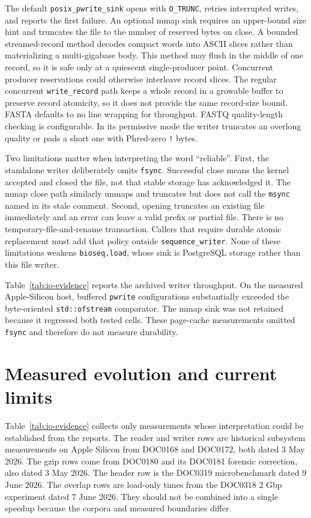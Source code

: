 The default \texttt{posix\_pwrite\_sink} opens with
\texttt{O\_TRUNC}, retries interrupted writes, and reports the first failure.
An optional mmap sink requires an upper-bound size hint and truncates the file
to the number of reserved bytes on close.  A bounded streamed-record method
decodes compact words into ASCII slices rather than materializing a
multi-gigabase body. This method may flush in the middle of one record, so it
is safe only at a quiescent single-producer point. Concurrent producer
reservations could otherwise interleave record slices. The regular concurrent
\texttt{write\_record} path keeps a whole record in a growable buffer to
preserve record atomicity, so it does not provide the same record-size bound.
FASTA defaults to no line wrapping for throughput.
FASTQ quality-length checking is configurable. In its permissive mode the
writer truncates an overlong quality or pads a short one with Phred-zero
\texttt{!} bytes.

Two limitations matter when interpreting the word ``reliable''. First, the
standalone writer deliberately omits \texttt{fsync}. Successful close means the
kernel accepted and closed the file, not that stable storage has acknowledged
it.  The mmap close path similarly unmaps and truncates but does not call the
\texttt{msync} named in its stale comment.  Second, opening truncates an
existing file immediately and an error can leave a valid prefix or partial
file.  There is no temporary-file-and-rename transaction.  Callers that require
durable atomic replacement must add that policy outside
\texttt{sequence\_writer}.  None of these limitations weakens
\texttt{bioseq.load}, whose sink is PostgreSQL storage rather than this file
writer.

Table~\ref{tab:io-evidence} reports the archived writer throughput. On the
measured Apple-Silicon host, buffered \texttt{pwrite} configurations
substantially exceeded the byte-oriented \texttt{std::ofstream} comparator.
The mmap sink was not retained because it regressed both tested cells. These
page-cache measurements omitted \texttt{fsync} and therefore do not measure
durability.

\section{Measured evolution and current limits}
\label{sec:io-evidence}

Table~\ref{tab:io-evidence} collects only measurements whose interpretation
could be established from the reports. The reader and writer rows are
historical subsystem measurements on Apple Silicon from DOC0168 and DOC0172,
both dated 3 May 2026. The gzip rows come from DOC0180 and its DOC0181
forensic correction, also dated 3 May 2026. The header row is the DOC0319
microbenchmark dated 9 June 2026. The overlap rows are load-only times from the
DOC0318 2 Gbp experiment dated 7 June 2026. They should not be combined into a
single speedup because the corpora and measured boundaries differ.

